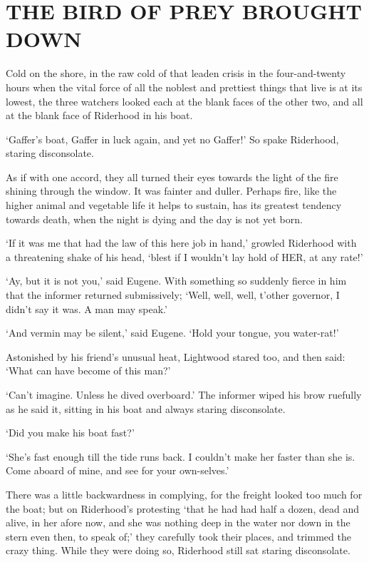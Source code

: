 
\chapter{THE BIRD OF PREY BROUGHT DOWN}

Cold on the shore, in the raw cold of that leaden crisis in the
four-and-twenty hours when the vital force of all the noblest and
prettiest things that live is at its lowest, the three watchers looked
each at the blank faces of the other two, and all at the blank face of
Riderhood in his boat.

‘Gaffer’s boat, Gaffer in luck again, and yet no Gaffer!’ So spake
Riderhood, staring disconsolate.

As if with one accord, they all turned their eyes towards the light of
the fire shining through the window. It was fainter and duller. Perhaps
fire, like the higher animal and vegetable life it helps to sustain, has
its greatest tendency towards death, when the night is dying and the day
is not yet born.

‘If it was me that had the law of this here job in hand,’ growled
Riderhood with a threatening shake of his head, ‘blest if I wouldn’t lay
hold of HER, at any rate!’

‘Ay, but it is not you,’ said Eugene. With something so suddenly fierce
in him that the informer returned submissively; ‘Well, well, well,
t’other governor, I didn’t say it was. A man may speak.’

‘And vermin may be silent,’ said Eugene. ‘Hold your tongue, you
water-rat!’

Astonished by his friend’s unusual heat, Lightwood stared too, and then
said: ‘What can have become of this man?’

‘Can’t imagine. Unless he dived overboard.’ The informer wiped his
brow ruefully as he said it, sitting in his boat and always staring
disconsolate.

‘Did you make his boat fast?’

‘She’s fast enough till the tide runs back. I couldn’t make her faster
than she is. Come aboard of mine, and see for your own-selves.’

There was a little backwardness in complying, for the freight looked too
much for the boat; but on Riderhood’s protesting ‘that he had had half a
dozen, dead and alive, in her afore now, and she was nothing deep in the
water nor down in the stern even then, to speak of;’ they carefully took
their places, and trimmed the crazy thing. While they were doing so,
Riderhood still sat staring disconsolate.

